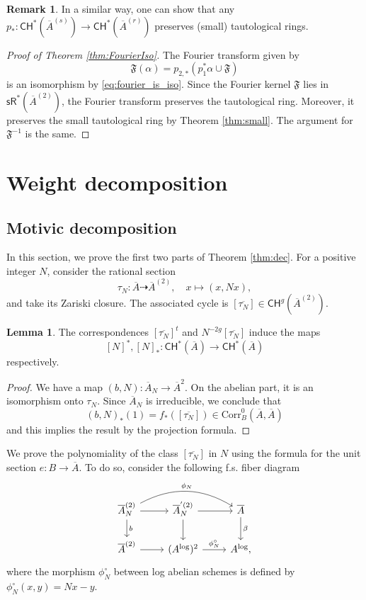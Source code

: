\documentclass[11pt]{article}
\def\CH{\mathsf{CH}}
\def\sR{\mathsf{sR}}
\def\fm{\mathfrak{F}}
\renewcommand{\log}{\mathrm{log}}
\newcommand{\barA}{\overline{A}}
\newcommand{\logA}{{A^{\log}}}
\newcommand{\corr}{\mathrm{Corr}}
\theoremstyle{definition}
\newtheorem{lemma}[definition]{Lemma}
\newtheorem{remark}[definition]{Remark}
\begin{document}
\begin{remark}\label{rmk:pushforward}
    In a similar way, one can show that any $p_* : \CH^*(\barA^{(s)}) \to \CH^*(\barA^{(r)})$ preserves (small) tautological rings.
\end{remark}

\begin{proof}[Proof of Theorem \ref{thm:FourierIso}]
    The Fourier transform given by
    $$
    \fm(\alpha) = p_{2,*}(p_1^* \alpha \cup \fm)
    $$
    is an isomorphism by \eqref{eq:fourier_is_iso}.
    Since the Fourier kernel $\fm$ lies in $\sR^*(\barA^{(2)})$, the Fourier transform preserves the tautological ring.
    Moreover, it preserves the small tautological ring by Theorem \ref{thm:small}. The argument for $\mathfrak F^{-1}$ is the same.
\end{proof}

\section{Weight decomposition}\label{sec:weight}

\subsection{Motivic decomposition}

In this section, we prove the first two parts of Theorem \ref{thm:dec}. For a positive integer $N$, consider the rational section
\[
\tau_N : \barA \dashrightarrow \barA^{(2)}, \quad x\mapsto (x,Nx),
\]
and take its Zariski closure. The associated cycle is $[\overline{\tau_N}] \in \CH^g(\barA^{(2)})$.

\begin{lemma}\label{lem:mapvscorr}
    The correspondences $[\overline{\tau_N}]^t$ and $N^{-2g}[\overline{\tau_N}]$ induce the maps
    $$
    [N]^*, [N]_* : \CH^*(\barA) \to \CH^*(\barA)
    $$
    respectively.
\end{lemma}
\begin{proof}
    We have a map $(b,N) : \barA_N \to \barA^{2}$. On the abelian part, it is an isomorphism onto $\tau_N$. Since $\barA_N$ is irreducible, we conclude that \begin{equation}\label{eq:correq}
        (b,N)_*(1) = f_*([\overline{\tau_N}]) \in\corr_B^0(\barA,\barA)
    \end{equation}
    and this implies the result by the projection formula.
\end{proof}

We prove the polynomiality of the class $[\overline{\tau_N}]$ in $N$ using the formula for the unit section $e : B\to \barA$. To do so, consider the following f.s. fiber diagram
\begin{equation}\label{eq:A2s}
    \begin{tikzcd}
    \barA_N^{(2)} \ar[rr, bend left, "\phi_N"] \ar[r] \ar[d,"b"] & \barA_N^{'(2)}\ar[d] \ar[r] & \barA \ar[d,"\beta"] \\
    \barA^{(2)} \ar[r] & (\logA)^2 \ar[r, "\phi_N^\circ"] & \logA,
    \end{tikzcd}
\end{equation}
where the morphism $\phi^\circ_N$ between log abelian schemes is defined by $\phi_N^\circ(x,y) = Nx-y$.
\end{document}
